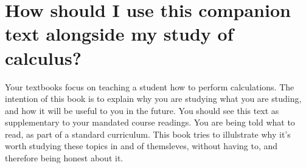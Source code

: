 \section{How should I use this companion text alongside my study of calculus?}
Your textbooks focus on teaching a student how to perform calculations. The intention of this book is to explain why you are studying what you are studing, and how it will be useful to you in the future. You should see this text as supplementary to your mandated course readings. You are being told what to read, as part of a standard curriculum. This book tries to illulstrate why it's worth studying these topics in and of themsleves, without having to, and therefore being honest about it.
